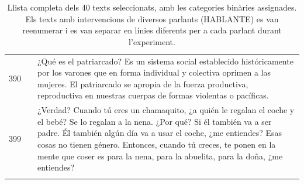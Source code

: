 \begin{longtable}{c>{\raggedright}p{2.0cm}p{12.1cm}}
390 &  & ¿Qué es el patriarcado? Es un sistema social establecido históricamente por los varones que en forma individual y colectiva oprimen a las mujeres. El patriarcado se apropia de la fuerza productiva, reproductiva en nuestras cuerpas de formas violentas o pacíficas. \\
399 &  & ¿Verdad? Cuando tú eres un chamaquito, ¿a quién le regalan el coche y el bebé? Se lo regalan a la nena. ¿Por qué? Si él también va a ser padre. Él también algún día va a usar el coche, ¿me entiendes? Esas cosas no tienen género. Entonces, cuando tú creces, te ponen en la mente que coser es para la nena, para la abuelita, para la doña, ¿me entiendes? \\
\bottomrule
\caption{Llista completa dels 40 texts seleccionats, amb les categories binàries assignades. Els texts amb intervencions de diversos parlants (HABLANTE) es van reenumerar i es van separar en línies diferents per a cada parlant durant l'experiment.}
\label{tab:texts_list}
\end{longtable}
\fi
